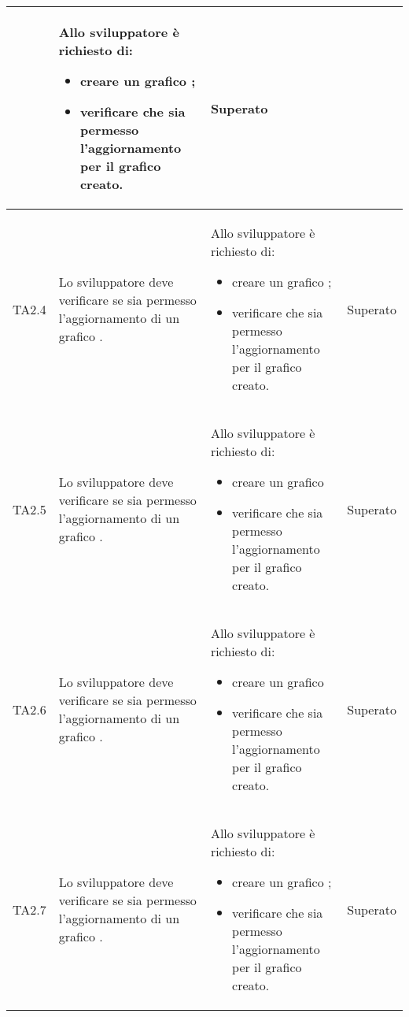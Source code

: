 \begin{longtabu}{| X[0.5] | X | X | X[0.5] |}
		& Allo sviluppatore è richiesto di:
		\begin{itemize}
			\item creare un grafico ;
			\item verificare che sia permesso l'aggiornamento  per il grafico creato.
		\end{itemize}
& Superato \\ \hline

	TA2.4 & Lo sviluppatore deve verificare se sia permesso l'aggiornamento  di un grafico .
		
		& Allo sviluppatore è richiesto di:
		\begin{itemize}
			\item creare un grafico ;
			\item verificare che sia permesso l'aggiornamento  per il grafico creato.
		\end{itemize}
& Superato \\ \hline

	TA2.5 & Lo sviluppatore deve verificare se sia permesso l'aggiornamento  di un grafico .
		
		& Allo sviluppatore è richiesto di:
		\begin{itemize}
			\item creare un grafico 
			\item verificare che sia permesso l'aggiornamento  per il grafico creato.
		\end{itemize}
& Superato \\ \hline

	TA2.6 & Lo sviluppatore deve verificare se sia permesso l'aggiornamento  di un grafico .
		
		& Allo sviluppatore è richiesto di:
		\begin{itemize}
			\item creare un grafico 
			\item verificare che sia permesso l'aggiornamento  per il grafico creato.
		\end{itemize}
& Superato \\ \hline

	TA2.7 & Lo sviluppatore deve verificare se sia permesso l'aggiornamento  di un grafico .
		
		& Allo sviluppatore è richiesto di:
		\begin{itemize}
			\item creare un grafico ;
			\item verificare che sia permesso l'aggiornamento  per il grafico creato.
		\end{itemize}
& Superato \\ \hline


\end{longtabu}
